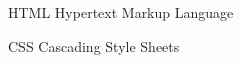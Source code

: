 \begin{siglas}
  \item[HTML] Hypertext Markup Language
  \item[CSS] Cascading Style Sheets
\end{siglas}
